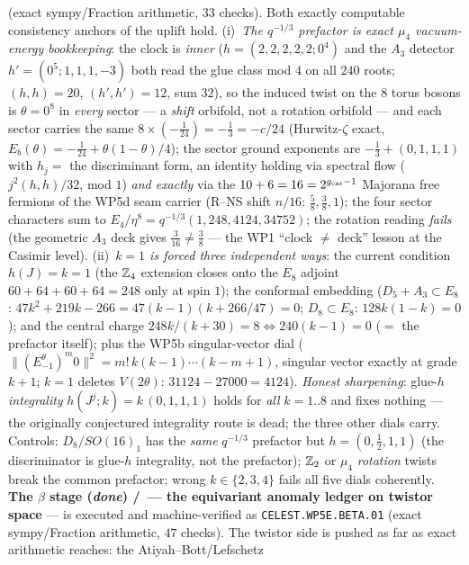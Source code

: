 (exact sympy/Fraction arithmetic, $33$ checks). Both exactly computable consistency anchors of the
uplift hold. (i)~\emph{The $q^{-1/3}$ prefactor is exact $\mu_4$ vacuum-energy bookkeeping}: the
clock is \emph{inner} ($h=(2,2,2,2,2;0^4)$ and the $A_3$ detector $h'=(0^5;1,1,1,-3)$ both read the
glue class mod $4$ on all $240$ roots; $(h,h)=20$, $(h',h')=12$, sum $32$), so the induced twist on
the $8$ torus bosons is $\theta=0^8$ in \emph{every} sector --- a \emph{shift} orbifold, not a
rotation orbifold --- and each sector carries the same $8\times(-\tfrac1{24})=-\tfrac13=-c/24$
(Hurwitz-$\zeta$ exact, $E_b(\theta)=-\tfrac1{24}+\theta(1-\theta)/4$); the sector ground exponents
are $-\tfrac13+(0,1,1,1)$ with $h_j=$ the discriminant form, an identity holding via spectral flow
($j^2(h,h)/32$, mod $1$) \emph{and exactly} via the $10+6=16=2^{g_{\mathrm{car}}-1}$ Majorana free fermions of
the WP5d seam carrier (R--NS shift $n/16$: $\tfrac58,\tfrac38,1$); the four sector characters sum to
$E_4/\eta^8=q^{-1/3}(1,248,4124,34752)$; the rotation reading \emph{fails} (the geometric $A_3$ deck
gives $\tfrac3{16}\neq\tfrac38$ --- the WP1 ``clock $\neq$ deck'' lesson at the Casimir level).
(ii)~\emph{$k=1$ is forced three independent ways}: the current condition $h(J)=k=1$ (the $\mathbb Z_4$
extension closes onto the $E_8$ adjoint $60{+}64{+}60{+}64=248$ only at spin $1$); the conformal
embedding ($D_5{+}A_3\subset E_8$: $47k^2{+}219k{-}266=47(k{-}1)(k{+}266/47)=0$; $D_8\subset E_8$:
$128k(1{-}k)=0$); and the central charge $248k/(k{+}30)=8\Leftrightarrow240(k{-}1)=0$ ($=$ the
prefactor itself); plus the WP5b singular-vector dial ($\|(E^\theta_{-1})^m0\|^2=m!\,k(k{-}1)\cdots
(k{-}m{+}1)$, singular vector exactly at grade $k{+}1$; $k=1$ deletes $V(2\theta)$:
$31124-27000=4124$). \emph{Honest sharpening}: glue-$h$ \emph{integrality} $h(J^j;k)=k\,(0,1,1,1)$
holds for \emph{all} $k=1..8$ and fixes nothing --- the originally conjectured integrality route is
dead; the three other dials carry. Controls: $D_8/SO(16)_1$ has the \emph{same} $q^{-1/3}$ prefactor
but $h=(0,\tfrac12,1,1)$ (the discriminator is glue-$h$ integrality, not the prefactor); $\mathbb Z_2$ or
$\mu_4$ \emph{rotation} twists break the common prefactor; wrong $k\in\{2,3,4\}$ fails all five
dials coherently. \textbf{The $\beta$ stage (\emph{done}) \mE/\mC\ --- the equivariant anomaly
ledger on twistor space} --- is executed and machine-verified as \texttt{CELEST.WP5E.BETA.01}
 (exact sympy/Fraction arithmetic, $47$
checks). The twistor side is pushed as far as exact arithmetic reaches: the Atiyah--Bott/Lefschetz
